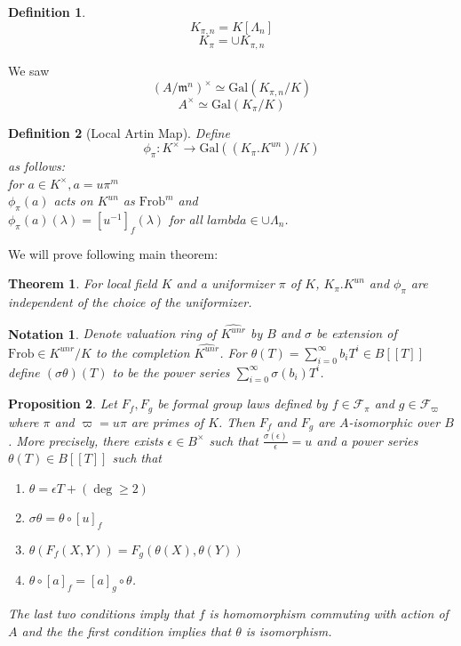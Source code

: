 \documentclass[twoside, 12pt]{iiser-thesis}
\newtheorem{thm}{{Theorem}}[section]
\newtheorem{prop}[thm]{ Proposition}
\newtheorem{defi}{ Definition}[section]
\newtheorem{notation}{ Notation}[section]
\newcommand{\gal}{\text{Gal}}
\begin{document}
\begin{defi}
$$K_{\pi,n}=K[\Lambda _n]$$ $$ K_\pi = \cup K_{\pi ,n}$$ 
\end{defi}
We saw $$ (A/ \mathfrak m^n ) ^\times \simeq \gal (K_{\pi,n}/K) $$ $$A^\times \simeq \gal(K_\pi /K)$$
\begin{defi}[Local Artin Map]
Define $$ \phi _\pi : K^\times \rightarrow \gal ((K_\pi . K^{un})/K)$$ as follows: \\
for $a \in K^\times ,a=u\pi ^m$ \\
$\phi _\pi (a)$ acts on $K^{un}$ as $\text{Frob} ^m$ and \\
$\phi _\pi (a) (\lambda )= [u^{-1}]_f(\lambda) $ for all $lambda \in \cup \Lambda _n$.
\end{defi}
We will prove following main theorem:
\begin{thm}
For local field $K$ and a uniformizer $\pi$ of $K$, $K_\pi . K^{un}$ and $\phi _\pi$ are independent of the choice of the uniformizer.
\end{thm}
\begin{notation}
Denote valuation ring of $\hat {K^{unr}}$ by $B$ and $\sigma$ be extension of $\text{Frob} \in K^{unr}/K$ to the completion $\hat {K^{unr}}$. For $\theta (T) = \sum _{i=0} ^{\infty} b_i T^i \in B[[T]]$ define $(\sigma \theta )(T)$ to be the power series $\sum _{i=0}^\infty \sigma (b_i)T^i$. 
\end{notation}
\begin{prop}
Let $F_f,F_g$ be formal group laws defined by $f \in \mathcal F _\pi$ and $g\in \mathcal F _{\varpi}$ where $\pi $ and $\varpi = u \pi$ are primes of $K$. Then $F_f$ and $F_g$ are $A$-isomorphic over $B$. More precisely, there exists $\epsilon \in B^ \times $ such that $\frac{\sigma (\epsilon)}{\epsilon}=u$ and a power series $\theta (T) \in B[[T]]$ such that \begin{enumerate}
    \item $\theta = \epsilon T + (\deg \geq 2)$
    \item $\sigma \theta = \theta \circ [u]_f$
    \item $\theta (F_f(X,Y)) = F_g(\theta (X), \theta (Y)) $
    \item $\theta \circ [a]_f=[a]_g\circ \theta$.
\end{enumerate}The last two conditions imply that $f$ is homomorphism commuting with action of $A$ and the 
the first condition implies that $\theta$ is isomorphism.
\end{prop}
\end{document}
